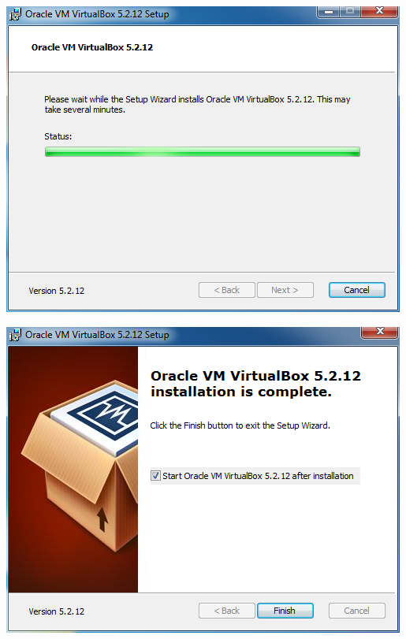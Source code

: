 \begin{center}
		\includegraphics[width=\linewidth]{Trabajo/Anexo01/oracleVirtualBox07.png}

		\includegraphics[width=\linewidth]{Trabajo/Anexo01/oracleVirtualBox08.png}
\end{center}